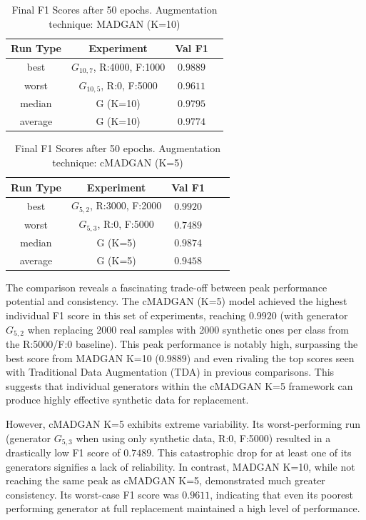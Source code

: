 \begin{table}[H]
	\vspace{-1.5em}
	\centering
	\begin{tabular}{|c|c|c|c|}
		\hline
		Run Type & Experiment & Val F1 \\ \hline
		best & \(G_{10, 7}\), R:4000, F:1000 & $0.9889$\\ \hline
		worst & \(G_{10, 5}\), R:0, F:5000 & $0.9611$\\ \hline
		median & G (K=10) & $0.9795$\\ \hline
		average & G (K=10) & $0.9774$
		\\ \hline
	\end{tabular}
    \caption{Final F1 Scores after 50 epochs. Augmentation technique: MADGAN (K=10)}
        \label{tab:res_replacement_mnist_cmadgan_vs_madgan__madgan}
\end{table}
\begin{table}[H]
	\centering
	\vspace{-1.5em}
	\begin{tabular}{|c|c|c|c|c|}
		\hline
		Run Type & Experiment & Val F1 \\ \hline
		best & \(G_{5, 2}\), R:3000, F:2000 & $0.9920$\\ \hline
		worst & \(G_{5, 3}\), R:0, F:5000 & $0.7489$\\ \hline
		median & G (K=5) & $0.9874$\\ \hline
		average & G (K=5) & $0.9458$
		\\ \hline
	\end{tabular}
    \caption{Final F1 Scores after 50 epochs. Augmentation technique: cMADGAN (K=5)}
        \label{tab:res_replacement_mnist_cmadgan_vs_madgan__cmadgan}
\end{table}
The comparison reveals a fascinating trade-off between peak performance potential and consistency. The cMADGAN (K=5) model achieved the highest individual F1 score in this set of experiments, reaching $0.9920$ (with generator \(G_{5,2}\) when replacing 2000 real samples with 2000 synthetic ones per class from the R:5000/F:0 baseline). This peak performance is notably high, surpassing the best score from MADGAN K=10 ($0.9889$) and even rivaling the top scores seen with Traditional Data Augmentation (TDA) in previous comparisons. This suggests that individual generators within the cMADGAN K=5 framework can produce highly effective synthetic data for replacement.

However, cMADGAN K=5 exhibits extreme variability. Its worst-performing run (generator \(G_{5,3}\) when using only synthetic data, R:0, F:5000) resulted in a drastically low F1 score of $0.7489$. This catastrophic drop for at least one of its generators signifies a lack of reliability. In contrast, MADGAN K=10, while not reaching the same peak as cMADGAN K=5, demonstrated much greater consistency. Its worst-case F1 score was $0.9611$, indicating that even its poorest performing generator at full replacement maintained a high level of performance.

